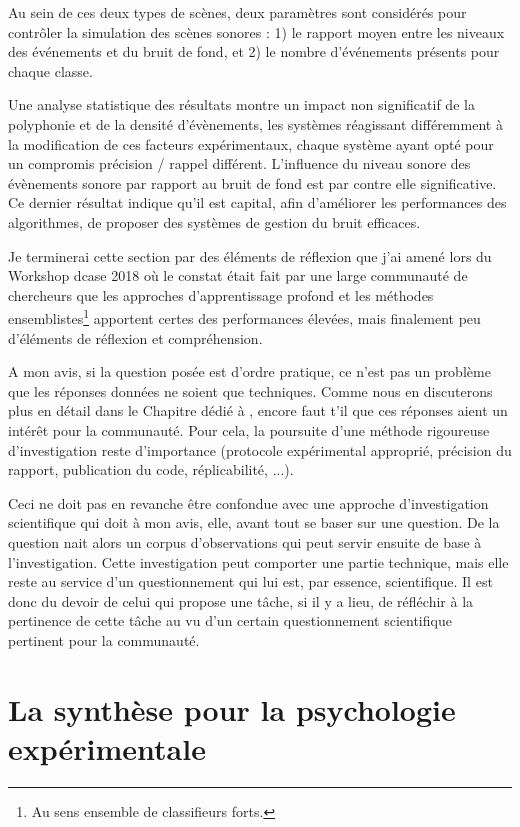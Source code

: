   Au sein de ces deux types de scènes, deux paramètres sont considérés pour contrôler la simulation des scènes sonores : 1) le rapport moyen entre les niveaux des événements et du bruit de fond, et 2) le nombre d'événements présents pour chaque classe.

  Une analyse statistique des résultats\cite{lafayhal-01635414} montre un impact non significatif de la polyphonie et de la densité d'évènements, les systèmes réagissant différemment à la modification de ces facteurs expérimentaux, chaque système ayant opté pour un compromis précision / rappel différent. L'influence du niveau sonore des évènements sonore par rapport au bruit de fond est par contre elle significative. Ce dernier résultat indique qu'il est capital, afin d'améliorer les performances des algorithmes, de proposer des systèmes de gestion du bruit efficaces.

  Je terminerai cette section par des éléments de réflexion que j'ai amené lors du Workshop dcase 2018 où le constat était fait par une large communauté de chercheurs que les approches d'apprentissage profond et les méthodes ensemblistes\footnote{Au sens ensemble de classifieurs forts.} apportent certes des performances élevées, mais finalement peu d'éléments de réflexion et compréhension.

  A mon avis, si la question posée est d'ordre pratique, ce n'est pas un problème que les réponses données ne soient que techniques. Comme nous en discuterons plus en détail dans le Chapitre dédié à , encore faut t'il que ces réponses aient un intérêt pour la communauté. Pour cela, la poursuite d'une méthode rigoureuse d'investigation reste d'importance (protocole expérimental approprié, précision du rapport, publication du code, réplicabilité, ...).

  Ceci ne doit pas en revanche être confondue avec une approche d'investigation scientifique qui doit à mon avis, elle, avant tout se baser sur une question. De la question nait alors un corpus d'observations qui peut servir ensuite de base à l'investigation. Cette investigation peut comporter une partie technique, mais elle reste au service d'un questionnement qui lui est, par essence, scientifique. Il est donc du devoir de celui qui propose une tâche, si il y a lieu, de réfléchir à la pertinence de cette tâche au vu d'un certain questionnement scientifique pertinent pour la communauté.

  \section{ \nmu La  synthèse pour la psychologie expérimentale} \label{sec:psycho}

